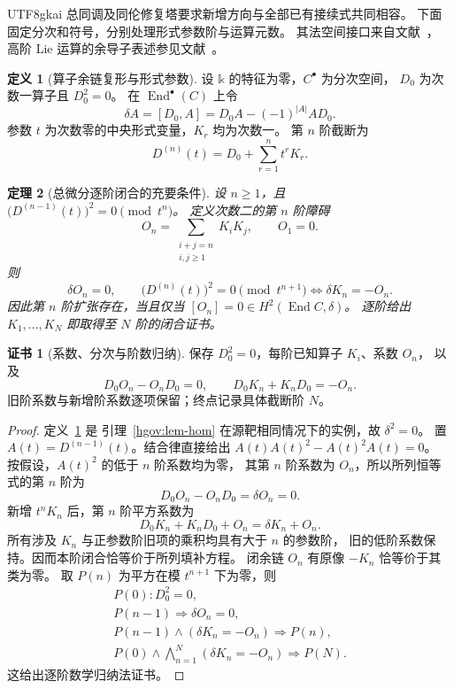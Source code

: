 \documentclass[12pt,a4paper,openany,notitlepage]{report}
\theoremstyle{plain}
\newtheorem{theorem}{定理}[chapter]
\theoremstyle{definition}
\newtheorem{definition}[theorem]{定义}
\newtheorem*{certificate}{证书}
\theoremstyle{remark}
\begin{document}
\begin{CJK*}{UTF8}{gkai}
总同调及同伦修复塔要求新增方向与全部已有接续式共同相容。
下面固定分次和符号，分别处理形式参数阶与运算元数。
其法空间接口来自文献~\cite{S01,S38}，
高阶 Lie 运算的余导子表述参见文献~\cite{ExtLadaMarkl}。

\begin{definition}[算子余链复形与形式参数]
\label{hgov:def-end}
设 $\mathbb k$ 的特征为零，$C^\bullet$ 为分次空间，
$D_0$ 为次数一算子且 $D_0^2=0$。
在 $\operatorname{End}^\bullet(C)$ 上令
\[
 \delta A=[D_0,A]
 =D_0A-(-1)^{|A|}AD_0.
\]
参数 $t$ 为次数零的中央形式变量，$K_r$ 均为次数一。
第 $n$ 阶截断为
\[
 D^{(n)}(t)=D_0+\sum_{r=1}^nt^rK_r.
\]
\end{definition}

\begin{theorem}[总微分逐阶闭合的充要条件]
\label{hgov:thm-total-tower}
设 $n\ge1$，且
$\bigl(D^{(n-1)}(t)\bigr)^2=0\pmod{t^n}$。
定义次数二的第 $n$ 阶障碍
\[
 O_n=\sum_{\substack{i+j=n\\i,j\ge1}}K_iK_j,
 \qquad O_1=0.
\]
则
\[
 \delta O_n=0,
 \qquad
 \bigl(D^{(n)}(t)\bigr)^2=0\pmod{t^{n+1}}
 \Longleftrightarrow
 \delta K_n=-O_n.
\]
因此第 $n$ 阶扩张存在，当且仅当
$[O_n]=0\in H^2(\operatorname{End}C,\delta)$。
逐阶给出 $K_1,\ldots,K_N$ 即取得至 $N$ 阶的闭合证书。
\end{theorem}
\begin{certificate}[系数、分次与阶数归纳]
保存 $D_0^2=0$，每阶已知算子 $K_i$、系数 $O_n$，
以及
\[
 D_0O_n-O_nD_0=0,\qquad
 D_0K_n+K_nD_0=-O_n.
\]
旧阶系数与新增阶系数逐项保留；终点记录具体截断阶 $N$。
\end{certificate}
\begin{proof}
定义~\ref{hgov:def-end} 是
引理~\ref{hgov:lem-hom} 在源靶相同情况下的实例，故 $\delta^2=0$。
置 $A(t)=D^{(n-1)}(t)$。结合律直接给出
$A(t)A(t)^2-A(t)^2A(t)=0$。
按假设，$A(t)^2$ 的低于 $n$ 阶系数均为零，
其第 $n$ 阶系数为 $O_n$，所以所列恒等式的第 $n$ 阶为
\[
 D_0O_n-O_nD_0=\delta O_n=0.
\]
新增 $t^nK_n$ 后，第 $n$ 阶平方系数为
\[
 D_0K_n+K_nD_0+O_n=\delta K_n+O_n.
\]
所有涉及 $K_n$ 与正参数阶旧项的乘积均具有大于 $n$ 的参数阶，
旧的低阶系数保持。因而本阶闭合恰等价于所列填补方程。
闭余链 $O_n$ 有原像 $-K_n$ 恰等价于其类为零。
取 $P(n)$ 为平方在模 $t^{n+1}$ 下为零，则
\[
 \begin{gathered}
 P(0):D_0^2=0,\\
 P(n-1)\Longrightarrow\delta O_n=0,\\
 P(n-1)\wedge(\delta K_n=-O_n)
 \Longrightarrow P(n),\\
 P(0)\wedge
 \bigwedge_{n=1}^{N}(\delta K_n=-O_n)
 \Longrightarrow P(N).
 \end{gathered}
\]
这给出逐阶数学归纳法证书。
\end{proof}



\end{CJK*}
\end{document}
